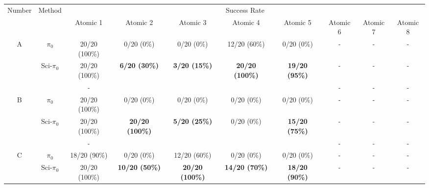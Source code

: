 \documentclass[letterpaper]{article} %
\begin{document}
\begin{table}[!ht]
    \setlength{\tabcolsep}{0.3pt}
  \begin{tabular}{cccccccccc}
    \toprule
    \multirow{2}{*}{Number}&\multirow{2}{*}{Method}&\multicolumn{8}{c}{Success Rate}\\
    \cline{3-10}
    &&Atomic 1&Atomic 2&Atomic 3&Atomic 4&Atomic 5&Atomic 6&Atomic 7&Atomic 8\\
    \midrule

    \multirow{3}{*}{A}& $\pi_0$ & 20/20 (100\%) & 0/20 (0\%) &0/20 (0\%)&12/20 (60\%)&0/20 (0\%)&-& -&-\\
    &\multirow{2}{*}{Sci-$\pi_0$} & \cellcolor{gray!25}20/20 (100\%) & \cellcolor{gray!25}\textbf{6/20 (30\%)} & \cellcolor{gray!25}\textbf{3/20 (15\%)} & \cellcolor{gray!25}\textbf{20/20 (100\%)} & \cellcolor{gray!25}\textbf{19/20 (95\%)} &\cellcolor{gray!25}-&\cellcolor{gray!25}-&\cellcolor{gray!25}-\\

    &&\cellcolor{gray!25}-&\cellcolor{gray!25}{\color{violet}$30\%\uparrow$}&\cellcolor{gray!25}{\color{violet}$15\%\uparrow$}&\cellcolor{gray!25}{\color{violet}$40\%\uparrow$}&\cellcolor{gray!25}{\color{violet}$95\%\uparrow$}&\cellcolor{gray!25}-&\cellcolor{gray!25}-&\cellcolor{gray!25}-\\

    \cline{1-10}
    \multirow{3}{*}{B}&$\pi_0$& 20/20 (100\%) & 0/20 (0\%) &0/20 (0\%)&0/20 (0\%)&0/20 (0\%)&-& -&-\\
    &\multirow{2}{*}{Sci-$\pi_0$} & \cellcolor{gray!25}20/20 (100\%) & \cellcolor{gray!25}\textbf{20/20 (100\%)} &\cellcolor{gray!25}\textbf{5/20 (25\%)}&\cellcolor{gray!25}0/20 (0\%)&\cellcolor{gray!25}\textbf{15/20 (75\%)}&\cellcolor{gray!25}-&\cellcolor{gray!25}-&\cellcolor{gray!25}-\\

    &&\cellcolor{gray!25}-&\cellcolor{gray!25}{\color{violet}$100\%\uparrow$}&\cellcolor{gray!25}{\color{violet}$25\%\uparrow$}&\cellcolor{gray!25}{-}&\cellcolor{gray!25}{\color{violet}$75\%\uparrow$}&\cellcolor{gray!25}-&\cellcolor{gray!25}-&\cellcolor{gray!25}-\\

    \cline{1-10}
    \multirow{3}{*}{C}&$\pi_0$& 18/20 (90\%) &0/20 (0\%) &12/20 (60\%)&0/20 (0\%)&0/20 (0\%)&-&-&-\\
    &\multirow{2}{*}{Sci-$\pi_0$} & \cellcolor{gray!25}20/20 (100\%) & \cellcolor{gray!25}\textbf{10/20 (50\%)} &\cellcolor{gray!25}\textbf{20/20 (100\%)}&\cellcolor{gray!25}\textbf{14/20 (70\%)}&\cellcolor{gray!25}\textbf{18/20 (90\%)}&\cellcolor{gray!25}-&\cellcolor{gray!25}-&\cellcolor{gray!25}-\\


\end{tabular}
\end{table}
\end{document}
